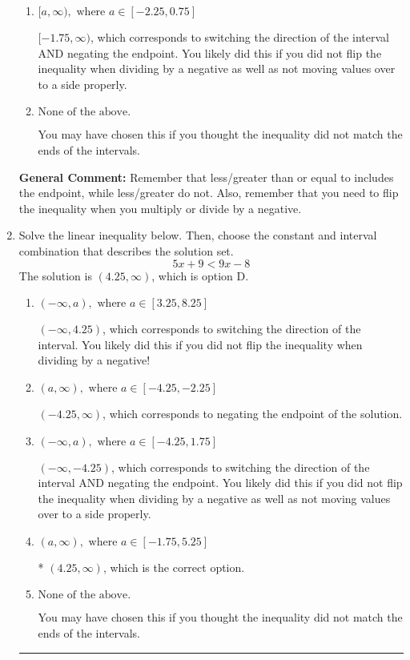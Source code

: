 \documentclass{extbook}[14pt]
\newcommand{\litem}[1]{\item #1

\rule{\textwidth}{0.4pt}}
\begin{document}
\begin{enumerate}
{\begin{enumerate}[label=\Alph*.]
* $(-\infty, 1.75]$, which is the correct option.
\item \( [a, \infty), \text{ where } a \in [-2.25, 0.75] \)

 $[-1.75, \infty)$, which corresponds to switching the direction of the interval AND negating the endpoint. You likely did this if you did not flip the inequality when dividing by a negative as well as not moving values over to a side properly.
\item \( \text{None of the above}. \)

You may have chosen this if you thought the inequality did not match the ends of the intervals.
\end{enumerate}

\textbf{General Comment:} Remember that less/greater than or equal to includes the endpoint, while less/greater do not. Also, remember that you need to flip the inequality when you multiply or divide by a negative.
}
\litem{
Solve the linear inequality below. Then, choose the constant and interval combination that describes the solution set.
\[ 5x + 9 < 9x -8 \]The solution is \( (4.25, \infty) \), which is option D.\begin{enumerate}[label=\Alph*.]
\item \( (-\infty, a), \text{ where } a \in [3.25, 8.25] \)

 $(-\infty, 4.25)$, which corresponds to switching the direction of the interval. You likely did this if you did not flip the inequality when dividing by a negative!
\item \( (a, \infty), \text{ where } a \in [-4.25, -2.25] \)

 $(-4.25, \infty)$, which corresponds to negating the endpoint of the solution.
\item \( (-\infty, a), \text{ where } a \in [-4.25, 1.75] \)

 $(-\infty, -4.25)$, which corresponds to switching the direction of the interval AND negating the endpoint. You likely did this if you did not flip the inequality when dividing by a negative as well as not moving values over to a side properly.
\item \( (a, \infty), \text{ where } a \in [-1.75, 5.25] \)

* $(4.25, \infty)$, which is the correct option.
\item \( \text{None of the above}. \)

You may have chosen this if you thought the inequality did not match the ends of the intervals.
\end{enumerate}

}
\end{enumerate}
\end{document}
